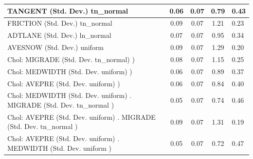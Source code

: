 \begin{table}
\begin{center}
\begin{tabular}{|l|l|c|c|c|l|}
			\hline
			TANGENT (Std. Dev.) tn_normal &  & 0.06 & 0.07 & 0.79 & 0.43 \\
			\hline
			FRICTION (Std. Dev.) tn_normal &  & 0.09 & 0.07 & 1.21 & 0.23 \\
			\hline
			ADTLANE (Std. Dev.) ln_normal &  & 0.07 & 0.07 & 0.95 & 0.34 \\
			\hline
			AVESNOW (Std. Dev.) uniform &  & 0.09 & 0.07 & 1.29 & 0.20 \\
			\hline
			 Chol: MIGRADE (Std. Dev. tn_normal) ) &  & 0.08 & 0.07 & 1.15 & 0.25 \\
			\hline
			 Chol: MEDWIDTH (Std. Dev. uniform) ) &  & 0.06 & 0.07 & 0.89 & 0.37 \\
			\hline
			 Chol: AVEPRE (Std. Dev. uniform) ) &  & 0.06 & 0.07 & 0.84 & 0.40 \\
			\hline
			 Chol: MEDWIDTH (Std. Dev. uniform) . MIGRADE (Std. Dev.   tn_normal ) &  & 0.05 & 0.07 & 0.74 & 0.46 \\
			\hline
			 Chol: AVEPRE (Std. Dev. uniform) . MIGRADE (Std. Dev.   tn_normal ) &  & 0.09 & 0.07 & 1.31 & 0.19 \\
			\hline
			 Chol: AVEPRE (Std. Dev. uniform) . MEDWIDTH (Std. Dev.   uniform ) &  & 0.05 & 0.07 & 0.72 & 0.47 \\
			\hline
		\end{tabular}
	\end{center}
\end{table}
